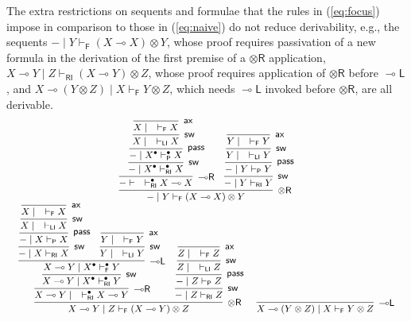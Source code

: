 \documentclass[copyright,creativecommons]{eptcs}
\theoremstyle{definition}
\newcommand{\tr}{\otimes \mathsf{R}}
\newcommand{\lright}{{\multimap}\mathsf{R}}
\newcommand{\lleft}{{\multimap}\mathsf{L}}
\newcommand{\pass}{\mathsf{pass}}
\newcommand{\ax}{\mathsf{ax}}
\newcommand{\ot}{\otimes}
\newcommand{\lolli}{\multimap}
\newcommand{\RI}{\mathsf{RI}}
\newcommand{\LI}{\mathsf{LI}}
\newcommand{\Pass}{\mathsf{P}}
\newcommand{\F}{\mathsf{F}}
\newcommand{\proofbox}[1]{\begin{tabular}{l} #1 \end{tabular}}
\begin{document}
 The extra restrictions on sequents and formulae that the rules in (\ref{eq:focus}) impose in comparison to those in (\ref{eq:naive}) do not reduce derivability, e.g., the sequents ${-} \mid Y \vdash_{\F} (X \lolli X) \ot Y$, whose proof requires passivation of a new formula in the derivation of the first premise of a $\tr$ application, $X \lolli Y \mid Z \vdash_{\RI} (X \lolli Y) \ot Z$, whose proof requires application of $\tr$ before $\lleft$,
 and $X \lolli (Y \ot Z) \mid X \vdash_\F Y \ot Z$, which needs $\lleft$ invoked before $\tr$, are all derivable.
 \begin{displaymath}
 \small
   \begin{array}{c}
    \proofbox{
     \infer[\tr]{{-} \mid Y \vdash_{\F} (X \lolli X) \ot Y}{
      \infer[\lright]{{-} \vdash \quad \vdash^{\bullet}_{\RI} X \lolli X}{
        \infer[\mathsf{sw}]{{-} \mid X^{\bullet} \vdash^{\bullet}_{\RI} X}{
          \infer[\pass]{{-} \mid X^{\bullet} \vdash^{\bullet}_{\Pass} X}{
            \infer[\mathsf{sw}]{X \mid \quad \vdash_{\LI} X}{
              \infer[\ax]{X \mid \quad \vdash_{\F} X}{}
            }
          }
        }
      }
      &
      \infer[\mathsf{sw}]{{-} \mid Y \vdash_{\RI} Y}{
        \infer[\pass]{{-} \mid Y \vdash_{\Pass} Y}{
          \infer[\mathsf{sw}]{Y \mid \quad \vdash_{\LI} Y}{
            \infer[\ax]{Y \mid \quad \vdash_{\F} Y}{}
          }
        }
      }
     }
     }
 \\
   \proofbox{
     \infer[\tr]{X \lolli Y \mid Z \vdash_{\F} (X \lolli Y) \ot Z}{
      \infer[\lright]{X \lolli Y \mid \quad \vdash^{\bullet}_{\RI} X \lolli Y}{
        \infer[\mathsf{sw}]{X \lolli Y \mid X^{\bullet} \vdash^{\bullet}_{\RI} Y}{
          \infer[\lleft]{X \lolli Y \mid X^{\bullet} \vdash^{\bullet}_{\F} Y}{
            \infer[\mathsf{sw}]{{-} \mid X \vdash_{\RI} X}{
              \infer[\pass]{{-} \mid X \vdash_{\Pass} X}{
                \infer[\mathsf{sw}]{X \mid \quad \vdash_{\LI} X}{
                  \infer[\ax]{X \mid \quad \vdash_{\F} X}{}
                }
              }
            }
            &
            \infer[\mathsf{sw}]{Y \mid \quad \vdash_{\LI} Y}{
              \infer[\ax]{Y \mid \quad \vdash_{\F} Y}{}
            }
          }
        }
      }
      &
      \infer[\mathsf{sw}]{{-} \mid Z \vdash_{\RI} Z}{
        \infer[\pass]{{-} \mid Z \vdash_{\Pass} Z}{
          \infer[\mathsf{sw}]{Z \mid \quad \vdash_{\LI} Z}{
            \infer[\ax]{Z \mid \quad \vdash_{\F} Z}{}
          }
        }
      }
     }
%
     \quad
     \infer[\lleft]{X \lolli (Y \ot Z) \mid X \vdash_{\F} Y \ot Z}{
}}
\end{array}
\end{displaymath}
\end{document}
